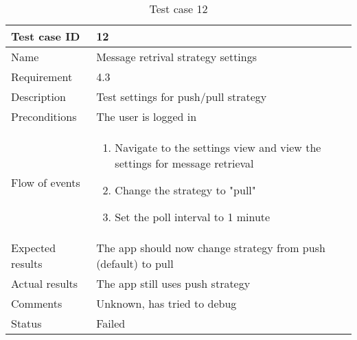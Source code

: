 		\begin{table}[htb]
			\begin{tabular}{l|p{10cm}}
				Test case ID & 12\\ \hline
				Name & Message retrival strategy settings\\ \hline
				Requirement & 4.3\\ \hline
				Description & Test settings for push/pull strategy\\ \hline
				Preconditions & The user is logged in\\ \hline
				Flow of events & 
					\begin{enumerate}
						\item{}Navigate to the settings view and view the settings for message retrieval
						\item{}Change the strategy to "pull"
						\item{}Set the poll interval to 1 minute
					\end{enumerate} \\ \hline
				Expected results & The app should now change strategy from push (default) to pull \\ \hline
				Actual results & The app still uses push strategy\\ \hline
				Comments & Unknown, has tried to debug\\ \hline
				Status & Failed\\ \hline
			\end{tabular}
			\caption{Test case 12} \label{tab:case12}
		\end{table}

